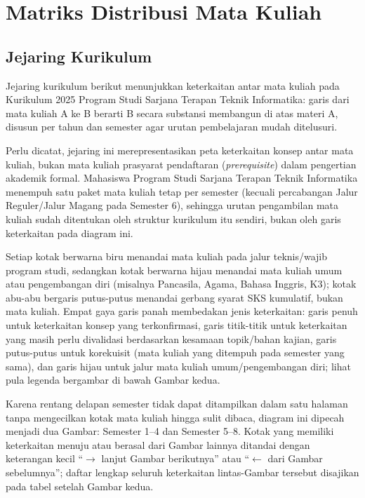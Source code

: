 \chapter{Matriks Distribusi Mata Kuliah}

\section{Jejaring Kurikulum}




Jejaring kurikulum berikut menunjukkan keterkaitan antar mata kuliah pada Kurikulum 2025 Program Studi Sarjana Terapan Teknik Informatika: garis dari mata kuliah A ke B berarti B secara substansi membangun di atas materi A, disusun per tahun dan semester agar urutan pembelajaran mudah ditelusuri.

Perlu dicatat, jejaring ini merepresentasikan peta keterkaitan konsep antar mata kuliah, bukan mata kuliah prasyarat pendaftaran (\emph{prerequisite}) dalam pengertian akademik formal. Mahasiswa Program Studi Sarjana Terapan Teknik Informatika menempuh satu paket mata kuliah tetap per semester (kecuali percabangan Jalur Reguler/Jalur Magang pada Semester 6), sehingga urutan pengambilan mata kuliah sudah ditentukan oleh struktur kurikulum itu sendiri, bukan oleh garis keterkaitan pada diagram ini.

Setiap kotak berwarna biru menandai mata kuliah pada jalur teknis/wajib program studi, sedangkan kotak berwarna hijau menandai mata kuliah umum atau pengembangan diri (misalnya Pancasila, Agama, Bahasa Inggris, K3); kotak abu-abu bergaris putus-putus menandai gerbang syarat SKS kumulatif, bukan mata kuliah. Empat gaya garis panah membedakan jenis keterkaitan: garis penuh untuk keterkaitan konsep yang terkonfirmasi, garis titik-titik untuk keterkaitan yang masih perlu divalidasi berdasarkan kesamaan topik/bahan kajian, garis putus-putus untuk korekuisit (mata kuliah yang ditempuh pada semester yang sama), dan garis hijau untuk jalur mata kuliah umum/pengembangan diri; lihat pula legenda bergambar di bawah Gambar kedua.

Karena rentang delapan semester tidak dapat ditampilkan dalam satu halaman tanpa mengecilkan kotak mata kuliah hingga sulit dibaca, diagram ini dipecah menjadi dua Gambar: Semester 1--4 dan Semester 5--8. Kotak yang memiliki keterkaitan menuju atau berasal dari Gambar lainnya ditandai dengan keterangan kecil ``$\rightarrow$ lanjut Gambar berikutnya'' atau ``$\leftarrow$ dari Gambar sebelumnya''; daftar lengkap seluruh keterkaitan lintas-Gambar tersebut disajikan pada tabel setelah Gambar kedua.

